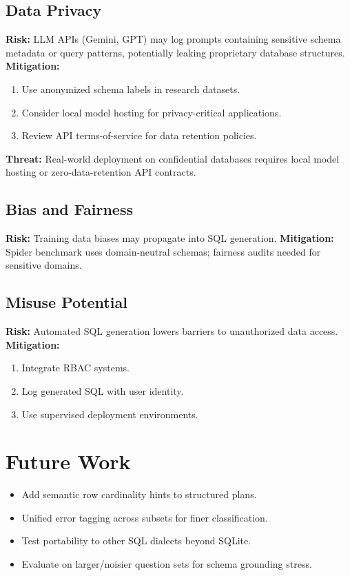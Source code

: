 \documentclass[12pt,a4paper]{report}
\begin{document}
\subsection{Data Privacy}
\textbf{Risk:} LLM APIs (Gemini, GPT) may log prompts containing sensitive schema metadata or query patterns, potentially leaking proprietary database structures.
\textbf{Mitigation:}
\begin{enumerate}
  \item Use anonymized schema labels in research datasets.
  \item Consider local model hosting for privacy-critical applications.
  \item Review API terms-of-service for data retention policies.
\end{enumerate}
\textbf{Threat:} Real-world deployment on confidential databases requires local model hosting or zero-data-retention API contracts.
\subsection{Bias and Fairness}
\textbf{Risk:} Training data biases may propagate into SQL generation.
\textbf{Mitigation:} Spider benchmark uses domain-neutral schemas; fairness audits needed for sensitive domains.
\subsection{Misuse Potential}
\textbf{Risk:} Automated SQL generation lowers barriers to unauthorized data access.
\textbf{Mitigation:}
\begin{enumerate}
  \item Integrate RBAC systems.
  \item Log generated SQL with user identity.
  \item Use supervised deployment environments.
\end{enumerate}
\section{Future Work}
\begin{itemize}
  \item Add semantic row cardinality hints to structured plans.
  \item Unified error tagging across subsets for finer classification.
  \item Test portability to other SQL dialects beyond SQLite.
  \item Evaluate on larger/noisier question sets for schema grounding stress.
\end{itemize}
\end{document}
